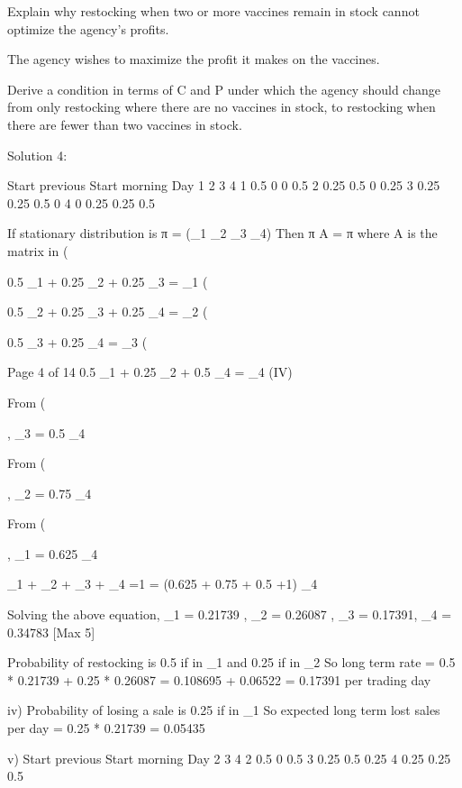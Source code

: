 \documentclass[a4paper,12pt]{article}
\begin{document}
\item  Explain why restocking when two or more vaccines remain in stock cannot optimize the agency’s profits.

The agency wishes to maximize the profit it makes on the vaccines.
\item   Derive a condition in terms of C and P under which the agency should change from only restocking where there are no vaccines in stock, to restocking when there are fewer than two vaccines in stock.


Solution 4:
\item 
Start previous Start morning
Day 1 2 3 4
1 0.5 0 0 0.5
2 0.25 0.5 0 0.25
3 0.25 0.25 0.5 0
4 0 0.25 0.25 0.5

\item  
If stationary distribution is π = (\pi_{1} \pi_{2} \pi_{3} \pi_{4})
Then π A = π where A is the matrix in (\item 

0.5 \pi_{1} + 0.25 \pi_{2} + 0.25 \pi_{3} = \pi_{1} (\item  
0.5 \pi_{2} + 0.25 \pi_{3} + 0.25 \pi_{4} = \pi_{2} (\item   
0.5 \pi_{3} + 0.25 \pi_{4} = \pi_{3} (\item  

Page 4 of 14
0.5 \pi_{1} + 0.25 \pi_{2} + 0.5 \pi_{4} = \pi_{4} (IV)

From (\item  , \pi_{3} = 0.5 \pi_{4}

From (\item  , \pi_{2} = 0.75 \pi_{4}

From (\item , \pi_{1} = 0.625 \pi_{4}

\pi_{1} + \pi_{2} + \pi_{3} + \pi_{4} =1 = (0.625 + 0.75 + 0.5 +1) \pi_{4}

Solving the above equation,
\pi_{1} = 0.21739 , \pi_{2} = 0.26087 , \pi_{3} = 0.17391, \pi_{4} = 0.34783 
[Max 5]
\item  
Probability of restocking is 0.5 if in \pi_{1} and 0.25 if in \pi_{2}
So long term rate = 0.5 * 0.21739 + 0.25 * 0.26087 
= 0.108695 + 0.06522 = 0.17391 per trading day 

iv)
Probability of losing a sale is 0.25 if in \pi_{1} 
So expected long term lost sales per day = 0.25 * 0.21739 = 0.05435 

v)
Start previous Start morning
Day 2 3 4
2 0.5 0 0.5
3 0.25 0.5 0.25
4 0.25 0.25 0.5
\end{document}
